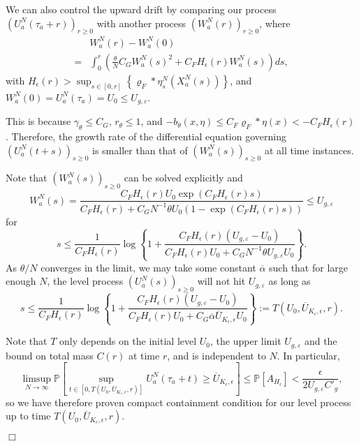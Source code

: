 \documentclass[12pt]{article}
\newenvironment {proof}{{\noindent\bf Proof }}{\hfill $\Box$ \medskip}
\def \bar{\overline}
\begin{document}
\begin{proof}
We can also control the upward drift by comparing our process $(U^N_{a}(\tau_a+r))_{r \geq 0}$ with another process $(W^N_a(r))_{r \geq 0}$, where 
\begin{align*}
&W^{N}_{a}(r)-W^{N}_{a}(0)\\
=&\int_{0}^{r}
\left(
        \frac{\theta}{N} C_G W^N_a(s)^2
        +
        C_F H_{\epsilon}(r) W^N_a(s)
    \right)
    ds,
\end{align*}
with $H_{\epsilon}(r) > \sup_{s\in [0,r]}\left\{\varrho_F*\eta^N_s(X^N_a(s)) \right\}$,
and $W^N_a(0)=U^N_a(\tau_a) = U_0 \leq U_{g,\varepsilon}$.

This is because $\gamma_{\theta} \leq C_G$, $r_{\theta} \leq 1$, and $-b_{\theta}(x, \eta) \leq  C_F \varrho_F * \eta(x) < -C_F H_{\epsilon}(r)$. Therefore, the growth rate of the differential equation governing $(U^N_a(t+s))_{s \geq 0}$ is smaller than that of $(W^N_a(s))_{s \geq 0}$ at all time instances.

Note that $(W^N_a(s))_{s \geq 0}$ can be solved explicitly and 
\begin{equation}
W^N_a(s) = \frac{C_F H_{\epsilon}(r) U_0 \exp(C_F H_{\epsilon}(r) s)}{C_F H_{\epsilon}(r)+C_G  N^{-1}\theta U_0(1- \exp(C_F H_{\epsilon}(r) s))}\leq U_{g,\varepsilon}    
\end{equation}
for 
\begin{equation}
    \label{eq: Bound on Level Hitting Time}
s \leq  \frac{1}{C_F H_{\epsilon}(r)} \log\left\{
1+
\frac{C_F H_{\epsilon}(r)
(U_{g,\varepsilon}
-U_0)
}
{C_F H_{\epsilon}(r)U_0 +C_G  N^{-1}\theta U_{g,\varepsilon}    U_0}
\right\}.
\end{equation}
As $\theta / N $ converges in the limit, we may take some constant $\bar{\alpha}$ such that for large enough $N$,
the level process $(U^N_{a}(s))_{s \geq 0}$ will not hit  $U_{g,\varepsilon}$ as long as
\begin{equation}
s \leq  \frac{1}{C_F H_{\epsilon}(r)} \log\left\{
1+
\frac{C_F H_{\epsilon}(r)
(U_{g,\varepsilon}
-U_0)
}
{C_F H_{\epsilon}(r)U_0 +C_G  \bar{\alpha} \overline{U}_{K_{\epsilon},\epsilon}    U_0}
\right\}:=T(U_0,\overline{U}_{K_{\epsilon},\epsilon},r).
\end{equation}

Note that $T$ only depends on the initial level $U_0$, the upper limit $U_{g,\varepsilon}$ and the bound on total mass $C(r)$ at time $r$, and is independent to $N$. 
In particular, 
\begin{equation}
\label{eq: Compact Containment for Levels}
\limsup_{N \to \infty}
\mathbb{P}\left[
\sup_{t \in [0, T(U_0,\overline{U}_{K_{\epsilon},\epsilon},r)]}
U^N_{a}(\tau_a + t)
\geq \overline{U}_{K_{\epsilon},\epsilon} 
\right]  
\leq \mathbb{P}[A_{H_{\epsilon}}]
< \frac{\epsilon}{2 U_{g,\varepsilon}C'_g},
\end{equation}
so we have therefore proven compact containment condition for our level process up to time $T(U_0,\overline{U}_{K_{\epsilon},\epsilon},r)$.


\end{proof}
\end{document}
